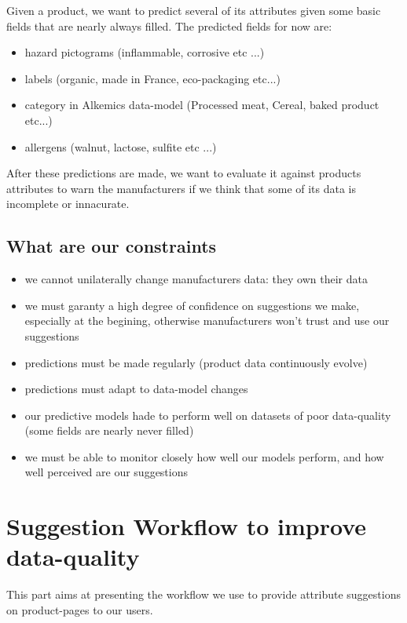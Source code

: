 Given a product, we want to predict several of its attributes given some basic fields that are nearly always filled.
The predicted fields for now are:
\begin{itemize}
	\item hazard pictograms (inflammable, corrosive etc ...)
	\item labels (organic, made in France, eco-packaging etc...)
	\item category in Alkemics data-model (Processed meat, Cereal, baked product etc...)
	\item allergens (walnut, lactose, sulfite etc ...)
\end{itemize}

After these predictions are made, we want to evaluate it against products attributes to warn the manufacturers if we think that some of its data is incomplete or innacurate.

\subsection{What are our constraints}
\begin{itemize}
\item we cannot unilaterally change manufacturers data: they own their data
\item we must garanty a high degree of confidence on suggestions we make, especially at the begining, otherwise manufacturers won't trust and use our suggestions
\item predictions must be made regularly (product data continuously evolve)
\item predictions must adapt to data-model changes
\item our predictive models hade to perform well on datasets of poor data-quality (some fields are nearly never filled)
\item we must be able to monitor closely how well our models perform, and how well perceived are our suggestions 
\end{itemize}


\pagebreak
\section{Suggestion Workflow to improve data-quality}


This part aims at presenting the workflow we use to provide attribute suggestions on product-pages to our users.

